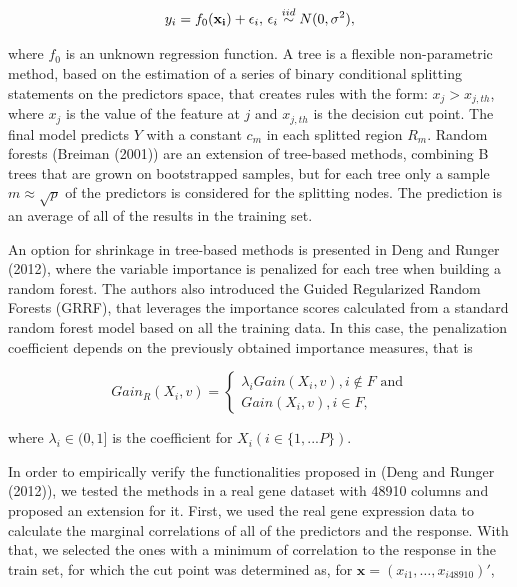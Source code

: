 \documentclass[]{article}
\begin{document}
\begin{equation}
y_i = f_0(\mathbf{x_i}) + \epsilon_i, \thinspace
\epsilon_i \stackrel{iid}\sim N(0, \sigma^2), 
\end{equation}

where \(f_0\) is an unknown regression function. A tree is a flexible
non-parametric method, based on the estimation of a series of binary
conditional splitting statements on the predictors space, that creates
rules with the form: \(x_j > x_{j,th}\), where \(x_j\) is the value of
the feature at \(j\) and \(x_{j,th}\) is the decision cut point. The
final model predicts \(Y\) with a constant \(c_m\) in each splitted
region \(R_m\). Random forests (Breiman (2001)) are an extension of
tree-based methods, combining B trees that are grown on bootstrapped
samples, but for each tree only a sample \(m \approx \sqrt p\) of the
predictors is considered for the splitting nodes. The prediction is an
average of all of the results in the training set.

An option for shrinkage in tree-based methods is presented in Deng and
Runger (2012), where the variable importance is penalized for each tree
when building a random forest. The authors also introduced the Guided
Regularized Random Forests (GRRF), that leverages the importance scores
calculated from a standard random forest model based on all the training
data. In this case, the penalization coefficient depends on the
previously obtained importance measures, that is

\begin{equation}
Gain_{R}(X_i, v) = 
\begin{cases}
\lambda_i Gain(X_i, v), i \notin F \text{ and} \\
Gain(X_i, v), i \in F, 
\end{cases}
\end{equation}

where \(\lambda_i \in (0, 1]\) is the coefficient for
\(X_i (i \in \{1,...P\})\).

In order to empirically verify the functionalities proposed in (Deng and
Runger (2012)), we tested the methods in a real gene dataset with 48910
columns and proposed an extension for it. First, we used the real gene
expression data to calculate the marginal correlations of all of the
predictors and the response. With that, we selected the ones with a
minimum of correlation to the response in the train set, for which the
cut point was determined as, for
\(\mathbf{x} = (x_{i1},\dots, x_{i48910})'\),
\end{document}
